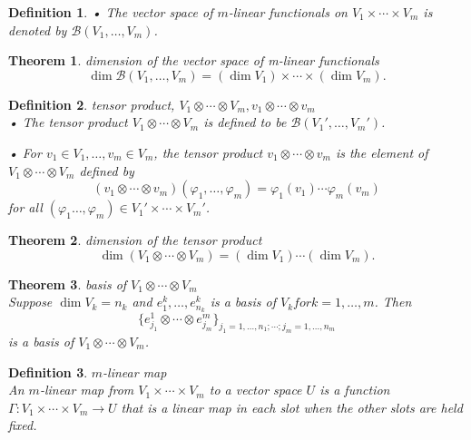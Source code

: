 \documentclass{article}
\newtheorem{theorem}{Theorem}[subsection]
\newtheorem{definition}{Definition}[subsection]
\begin{document}
\begin{CJK}{UTF8}{gkai}
\begin{definition}
    • The vector space of $m$-linear functionals on $V_1 \times \cdots \times V_m$ is denoted by $\mathcal{B}(V_1,\ldots,V_m)$.
\end{definition}

\begin{theorem}
    dimension of the vector space of m-linear functionals\\

    \[\dim\mathcal{B}(V_1,\ldots,V_m) = (\dim V_1)\times\cdots\times(\dim V_m).\]
\end{theorem}

\begin{definition}
    tensor product, $V_1 \otimes \cdots \otimes V_m, v_1 \otimes \cdots \otimes v_m$\\

    • The tensor product $V_1 \otimes \cdots\otimes V_m$ is defined to be $\mathcal{B}(V_1',\ldots,V_m')$.

    • For $v_1 \in V_1,\ldots,v_m \in V_m$, the tensor product $v_1 \otimes\cdots\otimes v_m$ is the element of $V_1 \otimes\cdots\otimes V_m$ defined by
    \[(v_1 \otimes\cdots\otimes v_m)(\varphi_1,\ldots,\varphi_m) = \varphi_1(v_1)\cdots\varphi_m(v_m)\]
    for all $(\varphi_1 \ldots,\varphi_m) \in V_1' \times \cdots\times V_m'$.
\end{definition}

\begin{theorem}
    dimension of the tensor product\\

    \[\dim(V_1 \otimes\cdots\otimes V_m) = (\dim V_1)\cdots(\dim V_m).\]
\end{theorem}

\begin{theorem}
    basis of $V_1 \otimes\cdots\otimes V_m$\\

 Suppose $\dim V_k = n_k$ and $e^k_1,\ldots,e^k_{n_k}$ is a basis of $V_k for k = 1,\ldots,m$. Then
    \[\{e^1_{j_1}\otimes \cdots \otimes e^m_{j_m} \}_{j_1=1,\ldots,n_1;\cdots;j_m=1,\ldots,n_m}\]
    is a basis of $V_1 \otimes \cdots\otimes V_m$.
\end{theorem}

\begin{definition}
    $m$-linear map\\

    An $m$-linear map from $V_1 \times \cdots \times V_m$ to a vector space $U$ is a function $\Gamma: V_1 \times\cdots\times V_m \to U$ that is a linear map in each slot when the other slots are held fixed. 
\end{definition}


\end{CJK}
\end{document}

